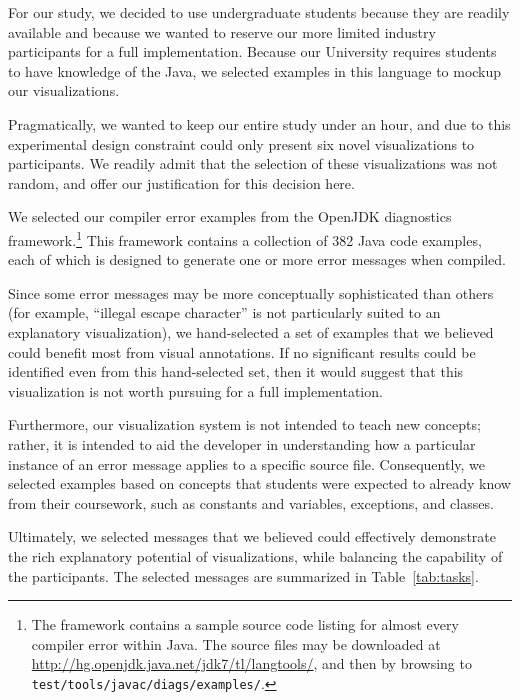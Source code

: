 \documentclass[conference]{IEEEtran}
\begin{document}
For our study, we decided to use undergraduate students because they are readily available and because we wanted to reserve our more limited industry participants for a full implementation. Because our University requires students to have knowledge of the Java, we selected examples in this language to mockup our visualizations.

Pragmatically, we wanted to keep our entire study under an hour, and due to this experimental design constraint could only present six novel visualizations to participants. We readily admit that the selection of these visualizations was not random, and offer our justification for this decision here. 

We selected our compiler error examples from the OpenJDK diagnostics framework.\footnote{The framework contains a sample source code listing for almost every compiler error within Java. The source files may be downloaded at \url{http://hg.openjdk.java.net/jdk7/tl/langtools/}, and then by browsing to \texttt{test/tools/javac/diags/examples/}.} This framework contains a collection of 382 Java code examples, each of which is designed to generate one or more error messages when compiled.

Since some error messages may be more conceptually sophisticated than others (for example, ``illegal escape character'' is not particularly suited to an explanatory visualization), we hand-selected a set of examples that we believed could benefit most from visual annotations. If no significant results could be identified even from this hand-selected set, then it would suggest that this visualization is not worth pursuing for a full implementation.

Furthermore, our visualization system is not intended to teach new concepts; rather, it is intended to aid the developer in understanding how a particular instance of an error message applies to a specific source file. Consequently, we selected examples based on concepts that students were expected to already know from their coursework, such as constants and variables, exceptions, and classes.


Ultimately, we selected messages that we believed could effectively demonstrate the rich explanatory potential of visualizations, while balancing the capability of the participants. The selected messages are summarized in Table~\ref{tab:tasks}.
\end{document}
